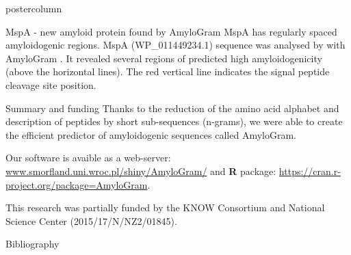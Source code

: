 \documentclass[final]{beamer}\usepackage[]{graphicx}\usepackage[]{color}
\begin{document}
\begin{frame}
\begin{columns}
\begin{column}{.48\textwidth}
\begin{beamercolorbox}[center,wd=\textwidth]{postercolumn}
\begin{minipage}[T]{.95\textwidth}
{\begin{block}{MspA - new amyloid protein found by AmyloGram}
MspA has regularly spaced amyloidogenic regions. MspA (WP\_011449234.1) sequence was analysed by \cite{christensen_sheaths_2018} with AmyloGram \citep{burdukiewicz_amyloidogenic_2017}. It revealed several regions of predicted high amyloidogenicity (above the horizontal lines). The red vertical line indicates the signal peptide cleavage site position.




\end{block}
\vfill

\begin{block}{Summary and funding}
Thanks to the reduction of the amino acid alphabet and description of peptides by 
short sub-sequences (n-grams), we were able to create the efficient predictor 
of amyloidogenic sequences called AmyloGram.

\bigskip

Our software is avaible as a web-server: \url{www.smorfland.uni.wroc.pl/shiny/AmyloGram/} and \textbf{R} package: \url{https://cran.r-project.org/package=AmyloGram}.

\small{This research was partially funded by the KNOW Consortium and National Science Center (2015/17/N/NZ2/01845).}

\end{block}
\vfill


 \begin{block}{Bibliography}
  \tiny{
  
  
  }
  \end{block}
  \vfill


}
\end{minipage}
\end{beamercolorbox}
\end{column}
\end{columns}  
\end{frame}
\end{document}
